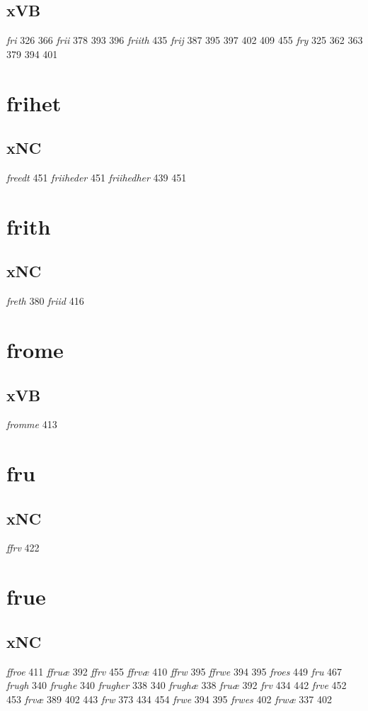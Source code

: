 \documentclass[a4paper,twocolumn]{article}
\begin{document}
\subsection{xVB}
\label{sec:orgde046af}
\emph{fri} 326 366 \emph{frii} 378 393 396 \emph{friith} 435 \emph{frij} 387 395 397 402 409 455 \emph{fry} 325 362 363 379 394 401 
\section{frihet}
\label{sec:orge0dfa32}
\subsection{xNC}
\label{sec:org5e822a2}
\emph{freedt} 451 \emph{friiheder} 451 \emph{friihedher} 439 451 
\section{frith}
\label{sec:org63f94d9}
\subsection{xNC}
\label{sec:orgcc2ebc0}
\emph{freth} 380 \emph{friid} 416 
\section{frome}
\label{sec:org28724ed}
\subsection{xVB}
\label{sec:org3fcdaa7}
\emph{fromme} 413 
\section{fru}
\label{sec:org82b85e3}
\subsection{xNC}
\label{sec:org505cb86}
\emph{ffrv} 422 
\section{frue}
\label{sec:org594cc0e}
\subsection{xNC}
\label{sec:org46a0188}
\emph{ffroe} 411 \emph{ffruæ} 392 \emph{ffrv} 455 \emph{ffrvæ} 410 \emph{ffrw} 395 \emph{ffrwe} 394 395 \emph{froes} 449 \emph{fru} 467 \emph{frugh} 340 \emph{frughe} 340 \emph{frugher} 338 340 \emph{frughæ} 338 \emph{fruæ} 392 \emph{frv} 434 442 \emph{frve} 452 453 \emph{frvæ} 389 402 443 \emph{frw} 373 434 454 \emph{frwe} 394 395 \emph{frwes} 402 \emph{frwæ} 337 402 
\end{document}
